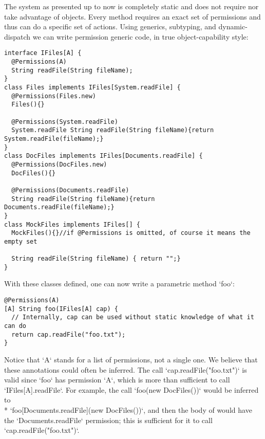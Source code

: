 \documentclass[a4paper,twoside,british,9pt]{extarticle}
\providecommand*{\code}[1]{\Q`#1`}
\begin{document}
The system as presented up to now is completely static and does not
require nor take advantage of objects. Every method requires an exact
set of permissions and thus can do a specific set of actions. Using
generics, subtyping, and dynamic-dispatch we can write permission generic code,
in true object-capability style:
\vspace{-1ex}
\begin{lstlisting}
interface IFiles[A] {
  @Permissions(A)
  String readFile(String fileName);
}
class Files implements IFiles[System.readFile] {
  @Permissions(Files.new)
  Files(){}
  
  @Permissions(System.readFile)
  System.readFile String readFile(String fileName){return System.readFile(fileName);}
}
class DocFiles implements IFiles[Documents.readFile] {
  @Permissions(DocFiles.new)
  DocFiles(){}
  
  @Permissions(Documents.readFile)
  String readFile(String fileName){return Documents.readFile(fileName);}
}
class MockFiles implements IFiles[] {
  MockFiles(){}//if @Permissions is omitted, of course it means the empty set 
  
  String readFile(String fileName) { return "";}
}
\end{lstlisting}
\vspace{-1ex}
 With these classes defined, one can now
write a parametric method \code{foo}:
\vspace{-1ex}
\begin{lstlisting}
@Permissions(A)
[A] String foo(IFiles[A] cap) {
  // Internally, cap can be used without static knowledge of what it can do
  return cap.readFile("foo.txt");
}
\end{lstlisting}
\vspace{-1ex}
Notice that \code{A} stands for a list of permissions, not a single
one. 
We believe that these annotations could often be inferred. The call \code{cap.readFile("foo.txt")}
is valid since \code{foo} has permission \code{A}, which is more
than sufficient to call \code{IFiles[A].readFile}.
For example, the call \code{foo(new DocFiles())} would be inferred to\\* \code{foo[Documents.readFile](new DocFiles())}, 
and then the body of \Q@foo@ would have the \code{Documents.readFile} permission; this is sufficient for it to call
\code{cap.readFile("foo.txt")}.
\end{document}
